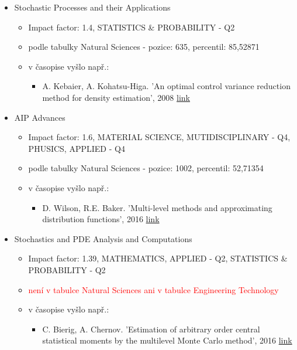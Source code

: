 \documentclass[a4paper]{article}
\begin{document}
\begin{itemize}
\item Stochastic Processes and their Applications
\begin{itemize}
\item Impact factor: 1.4, STATISTICS \& PROBABILITY - Q2
\item podle tabulky Natural Sciences - pozice: 635, percentil: 85,52871
\item v časopise vyšlo např.:
\begin{itemize}
\item A. Kebaier, A. Kohatsu-Higa. 'An optimal control variance reduction method for density estimation', 2008  \href{http://www.ritsumei.ac.jp/~khts00/papers/Kebaier_Kohatsu-Higa_Final_version.pdf}{link}      
\end{itemize}
\end{itemize}


\item AIP Advances
\begin{itemize}
\item Impact factor: 1.6, MATERIAL SCIENCE, MUTIDISCIPLINARY - Q4, PHUSICS, APPLIED - Q4
\item podle tabulky Natural Sciences - pozice: 1002, percentil: 52,71354
\item v časopise vyšlo např.:
\begin{itemize}
\item D. Wilson, R.E. Baker. 'Multi-level methods and approximating distribution functions', 2016         \href{https://aip.scitation.org/doi/full/10.1063/1.4960118}{link}
\end{itemize}
\end{itemize}



\item Stochastics and PDE Analysis and Computations
\begin{itemize}
\item Impact factor: 1.39, MATHEMATICS, APPLIED - Q2, STATISTICS \& PROBABILITY - Q2
\item \textcolor{red}{není v tabulce Natural Sciences ani v tabulce Engineering Technology}
\item v časopise vyšlo např.:
\begin{itemize}
\item C. Bierig, A. Chernov. 'Estimation of arbitrary order central statistical moments by the multilevel Monte Carlo method', 2016 \href{https://link.springer.com/article/10.1007/s40072-015-0063-9}{link}
\end{itemize}
\end{itemize}


\end{itemize}
\end{document}
